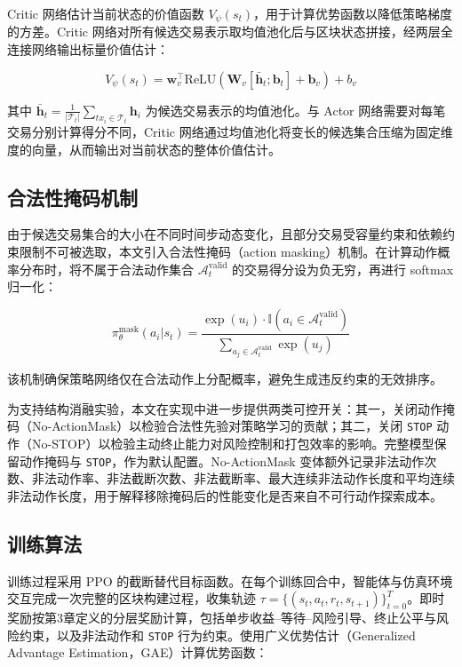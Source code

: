 Critic 网络估计当前状态的价值函数 $V_\psi(s_t)$，用于计算优势函数以降低策略梯度的方差。Critic 网络对所有候选交易表示取均值池化后与区块状态拼接，经两层全连接网络输出标量价值估计：

\begin{equation}
  V_\psi(s_t) = \mathbf{w}_v^\top \text{ReLU}(\mathbf{W}_v [\bar{\mathbf{h}}_t; \mathbf{b}_t] + \mathbf{b}_v) + b_v
\end{equation}

其中 $\bar{\mathbf{h}}_t = \frac{1}{|\mathcal{T}_t|}\sum_{tx_i \in \mathcal{T}_t} \mathbf{h}_i$ 为候选交易表示的均值池化。与 Actor 网络需要对每笔交易分别计算得分不同，Critic 网络通过均值池化将变长的候选集合压缩为固定维度的向量，从而输出对当前状态的整体价值估计。

\subsection{合法性掩码机制}

由于候选交易集合的大小在不同时间步动态变化，且部分交易受容量约束和依赖约束限制不可被选取，本文引入合法性掩码（action masking）机制。在计算动作概率分布时，将不属于合法动作集合 $\mathcal{A}_t^{\text{valid}}$ 的交易得分设为负无穷，再进行 softmax 归一化：

\begin{equation}
  \pi_\theta^{\text{mask}}(a_i|s_t) = \frac{\exp(u_i) \cdot \mathbb{I}(a_i \in \mathcal{A}_t^{\text{valid}})}{\sum_{a_j \in \mathcal{A}_t^{\text{valid}}} \exp(u_j)}
\end{equation}

该机制确保策略网络仅在合法动作上分配概率，避免生成违反约束的无效排序。

为支持结构消融实验，本文在实现中进一步提供两类可控开关：其一，关闭动作掩码（No-ActionMask）以检验合法性先验对策略学习的贡献；其二，关闭 \texttt{STOP} 动作（No-STOP）以检验主动终止能力对风险控制和打包效率的影响。完整模型保留动作掩码与 \texttt{STOP}，作为默认配置。No-ActionMask 变体额外记录非法动作次数、非法动作率、非法截断次数、非法截断率、最大连续非法动作长度和平均连续非法动作长度，用于解释移除掩码后的性能变化是否来自不可行动作探索成本。

\subsection{训练算法}

训练过程采用 PPO 的截断替代目标函数。在每个训练回合中，智能体与仿真环境交互完成一次完整的区块构建过程，收集轨迹 $\tau = \{(s_t, a_t, r_t, s_{t+1})\}_{t=0}^{T}$。即时奖励按第3章定义的分层奖励计算，包括单步收益--等待--风险引导、终止公平与风险约束，以及非法动作和 \texttt{STOP} 行为约束。使用广义优势估计（Generalized Advantage Estimation，GAE）计算优势函数：

